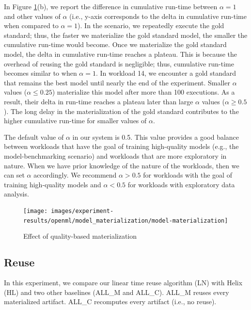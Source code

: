 In Figure \ref{exp-model-materialization}(b), we report the difference in cumulative run-time between $\alpha=1$ and other values of $\alpha$ (i.e., y-axis corresponds to the delta in cumulative run-time when compared to $\alpha=1$).
In the scenario, we repeatedly execute the gold standard; thus, the faster we materialize the gold standard model, the smaller the cumulative run-time would become.
Once we materialize the gold standard model, the delta in cumulative run-time reaches a plateau.
This is because the overhead of reusing the gold standard is negligible; thus, cumulative run-time becomes similar to when $\alpha=1$.
In workload 14, we encounter a gold standard that remains the best model until nearly the end of the experiment.
Smaller $\alpha$ values ($\alpha \leq 0.25$) materialize this model after more than 100 executions.
As a result, their delta in run-time reaches a plateau later than large $\alpha$ values ($\alpha\geq 0.5$).
The long delay in the materialization of the gold standard contributes to the higher cumulative run-time for smaller values of $\alpha$.

The default value of $\alpha$ in our system is 0.5. 
This value provides a good balance between workloads that have the goal of training high-quality models (e.g., the model-benchmarking scenario) and workloads that are more exploratory in nature.
When we have prior knowledge of the nature of the workloads, then we can set $\alpha$ accordingly.
We recommend $\alpha>0.5$ for workloads with the goal of training high-quality models and $\alpha<0.5$ for workloads with exploratory data analysis.
\begin{figure}[t]
\centering
\texttt{[image: images/experiment-results/openml/model\_materialization/model-materialization]}
\caption{Effect of quality-based materialization}
\label{exp-model-materialization}
\end{figure}

\subsection{Reuse}
In this experiment, we compare our linear time reuse algorithm (LN) with Helix (HL) and two other baselines (ALL\_M and ALL\_C).
ALL\_M reuses every materialized artifact.
ALL\_C recomputes every artifact (i.e., no reuse).


